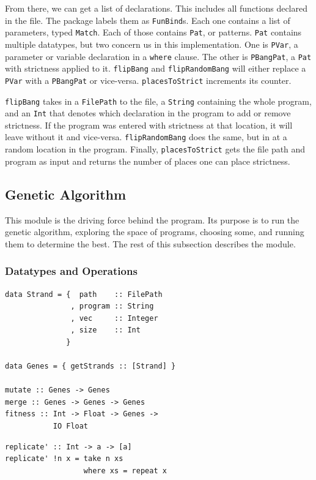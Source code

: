 \documentclass[preprint,nocopyrightspace]{sigplanconf}
\begin{document}
From there, we can get a list of declarations. This includes all functions declared in the file. The package labels them as \lstinline!FunBind!s. Each one contains a list of parameters, typed \lstinline!Match!. Each of those contains \lstinline!Pat!, or patterns. \lstinline!Pat! contains multiple datatypes, but two concern us in this implementation. One is \lstinline!PVar!, a parameter or variable declaration in a \lstinline!where! clause. The other is \lstinline!PBangPat!, a \lstinline!Pat! with strictness applied to it. \lstinline!flipBang! and \lstinline!flipRandomBang! will either replace a \lstinline!PVar! with a \lstinline!PBangPat! or vice-versa. \lstinline!placesToStrict! increments its counter.

\lstinline!flipBang! takes in a \lstinline!FilePath! to the file, a \lstinline!String! containing the whole program, and an \lstinline!Int! that denotes which declaration in the program to add or remove strictness. If the program was entered with strictness at that location, it will leave without it and vice-versa. \lstinline!flipRandomBang! does the same, but in at a random location in the program. Finally, \lstinline!placesToStrict! gets the file path and program as input and returns the number of places one can place strictness.

\subsection{Genetic Algorithm}
This module is the driving force behind the program. Its purpose is to run the genetic algorithm, exploring the space of programs, choosing some, and running them to determine the best. The rest of this subsection describes the module.
\subsubsection{Datatypes and Operations}
\begin{lstlisting}[float,caption=Datatypes and operations in Genetic module,label={lst:genetic},frame=single]
data Strand = {  path    :: FilePath
               , program :: String
               , vec     :: Integer
               , size    :: Int
              }

data Genes = { getStrands :: [Strand] }

mutate :: Genes -> Genes
merge :: Genes -> Genes -> Genes
fitness :: Int -> Float -> Genes -> 
           IO Float
\end{lstlisting}
\begin{lstlisting}[float,caption=Example program,label={lst:example},frame=single]
replicate' :: Int -> a -> [a]
replicate' !n x = take n xs
                  where xs = repeat x
\end{lstlisting}
\end{document}
